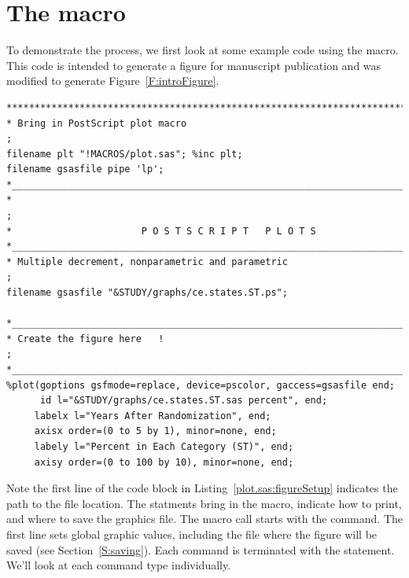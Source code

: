 \documentclass[nojss]{jss}\usepackage[]{graphicx}\usepackage[]{color}
\begin{document}
\section[The plot.sas macro]{The  macro}\label{S:plot.sas}

To demonstrate the process, we first look at some example code using the  macro. This code is intended to generate a figure for manuscript publication and was modified to generate Figure~\ref{F:introFigure}.
\begin{lstlisting}[float,floatplacement=!htpb, caption={plot.sas commands: Figure setup.},label={plot.sas:figureSetup}]
%let STUDY=/studies/cardiac/valves/aortic/replacement/partner_publication_office/partner1b/mortality_5y
*****************************************************************************;
* Bring in PostScript plot macro                                             ;
filename plt "!MACROS/plot.sas"; %inc plt;
filename gsasfile pipe 'lp';
*____________________________________________________________________________;
*                                                                            ;
*                       P O S T S C R I P T   P L O T S
*____________________________________________________________________________;
* Multiple decrement, nonparametric and parametric                           ;
filename gsasfile "&STUDY/graphs/ce.states.ST.ps";

*____________________________________________________________________________;
* Create the figure here   !                                                 ;
*____________________________________________________________________________;
%plot(goptions gsfmode=replace, device=pscolor, gaccess=gsasfile end;
      id l="&STUDY/graphs/ce.states.ST.sas percent", end;
     labelx l="Years After Randomization", end;
     axisx order=(0 to 5 by 1), minor=none, end;
     labely l="Percent in Each Category (ST)", end;
     axisy order=(0 to 100 by 10), minor=none, end;
\end{lstlisting}

Note the first line of the code block in Listing~\ref{plot.sas:figureSetup} indicates the path to the file location. The  statments bring in the  macro, indicate how to print, and where to save the graphics file. The  macro call starts with the  command. The first line sets global graphic values, including the file where the figure will be saved (see Section~\ref{S:saving}). Each  command is terminated with the  statement. We'll look at each command type individually.
\end{document}
